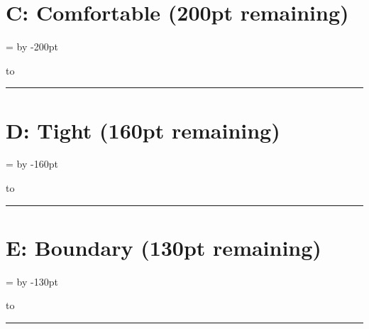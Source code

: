 \documentclass[a4paper,11pt]{article}
\begin{document}
\section*{C: Comfortable (200pt remaining)}

\pbht=\textheight
\advance\pbht by -200pt

\vbox to\pbht{%
  \lipsum[1-2]%
  \vss
}%

\begin{swarmwrap}%
  \begin{minipage}[t]{3cm}
    \centering
    \rule{\linewidth}{2.5cm}
  \end{minipage}%
\end{swarmwrap}%
\swarmwrapnext
\lipsum[1]

\newpage
\section*{D: Tight (160pt remaining)}

\pbht=\textheight
\advance\pbht by -160pt

\vbox to\pbht{%
  \lipsum[1-2]%
  \vss
}%

\begin{swarmwrap}%
  \begin{minipage}[t]{3cm}
    \centering
    \rule{\linewidth}{2.5cm}
  \end{minipage}%
\end{swarmwrap}%
\swarmwrapnext
\lipsum[1]

\newpage
\section*{E: Boundary (130pt remaining)}

\pbht=\textheight
\advance\pbht by -130pt

\vbox to\pbht{%
  \lipsum[1-2]%
  \vss
}%

\begin{swarmwrap}%
  \begin{minipage}[t]{3cm}
    \centering
    \rule{\linewidth}{2.5cm}
  \end{minipage}%
\end{swarmwrap}%
\swarmwrapnext
\lipsum[1]
\end{document}
